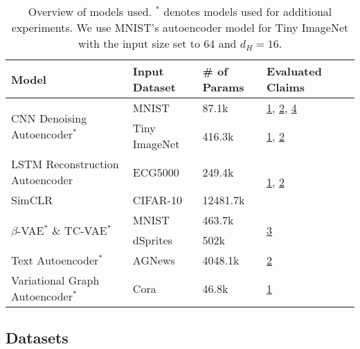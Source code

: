 \begin{table}[H]
    \small
    \centering
    \begin{tabular}{lllll}
    \toprule
     \textbf{Model} & \textbf{Input Dataset} & \textbf{\# of Params} & \textbf{Evaluated Claims}\\
    \midrule 
    \multirow{2}{*}{CNN Denoising Autoencoder$^*$} & MNIST & 87.1k  &  \hyperref[claim1]{1}, \hyperref[claim2]{2},  \hyperref[claim4]{4} \\
        &     Tiny ImageNet & 416.3k &  \hyperref[claim1]{1}, \hyperref[claim2]{2}\\
    \midrule   
    LSTM Reconstruction Autoencoder &  ECG5000 & 249.4k & \multirow{2}{*}{\hyperref[claim1]{1}, \hyperref[claim2]{2}}  \\
    SimCLR & CIFAR-10 & 12481.7k  \\
    \midrule
      \multirow{2}{*}{$\beta$-VAE$^*$ \& TC-VAE$^*$} & MNIST & 463.7k  & \multirow{2}{*}{\hyperref[claim3]{3}} \\
        &     dSprites & 502k & \\ 
    \midrule
    Text Autoencoder$^*$  & AGNews & 4048.1k &  \hyperref[claim2]{2}\\
    Variational Graph Autoencoder$^*$  & Cora & 46.8k &  \hyperref[claim1]{1} \\

    \bottomrule
    \end{tabular}
    \caption{Overview of models used. $^*$ denotes models used for additional experiments. We use MNIST's autoencoder model for Tiny ImageNet with the input size set to 64 and $d_H=16$.}
    \label{tab:modeloverview}
\end{table}


\subsection{Datasets}

